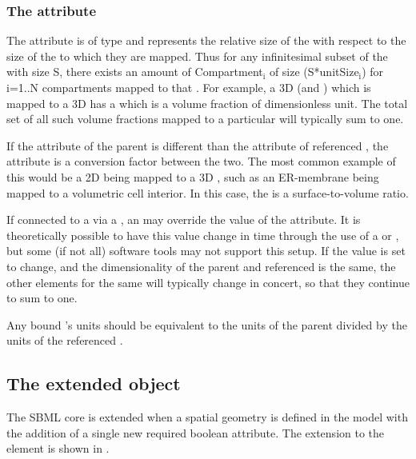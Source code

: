 \subsubsection{The  attribute}
The  attribute is of type  and represents the relative size of the \Compartment with respect to the size of the \Domains to which they are mapped.  Thus for any infinitesimal subset of the \Domain with size S, there exists an amount of Compartment$_{\text{i}}$ of size (S*unitSize$_{\text{i}}$) for i=1..N compartments mapped to that \DomainType.  For example, a 3D \Compartment (and \DomainType) which is mapped to a 3D \DomainType has a  which is a volume fraction of dimensionless unit.  The total set of all such volume fractions mapped to a particular \DomainType will typically sum to one. 

If the  attribute of the parent \Compartment is different than the  attribute of referenced \DomainType, the  attribute is a conversion factor between the two.  The most common example of this would be a 2D \Compartment being mapped to a 3D \DomainType, such as an ER-membrane being mapped to a volumetric cell interior.  In this case, the  is a surface-to-volume ratio.

If connected to a \Parameter via a \SpatialSymbolReference, an \InitialAssignment may override the value of the  attribute.  It is theoretically possible to have this value change in time through the use of a \Rule or \Event, but some (if not all) software tools may not support this setup.  If the value is set to change, and the dimensionality of the parent \Compartment and referenced \DomainType is the same, the other \CompartmentMapping elements for the same \DomainType will typically change in concert, so that they continue to sum to one.

Any bound \Parameter's units should be equivalent to the units of the parent \Compartment divided by the units of the referenced \DomainType. 



\subsection{The extended \Species object}
\label{extended-species-class}
The SBML core \Species is extended when a spatial geometry is defined in the model with the addition of a single new required boolean  attribute.  The extension to the \Species element is shown in .
 
